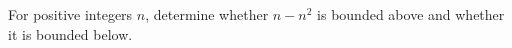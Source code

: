 For positive integers $ n $, determine whether $ n-n^2 $ is bounded above and whether it is bounded below.
